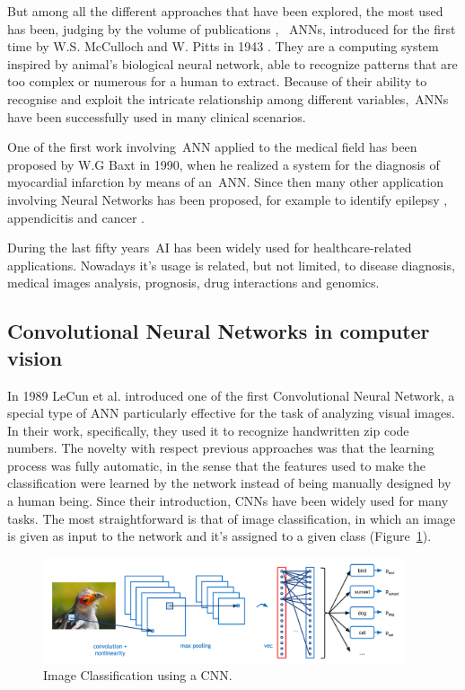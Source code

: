 \vspace{5mm}
But among all the different approaches that have been explored, the most used has been, judging by the volume of publications \cite{steimann2001use}, ~\acp{ANN}, introduced for the first time by W.S. McCulloch and W. Pitts in 1943 \cite{mcculloch1943logical}. They are a computing system inspired by animal's biological neural network, able to recognize patterns that are too complex or numerous for a human to extract. Because of their ability to recognise and exploit the intricate relationship among different variables,~\acp{ANN} have been successfully used in many clinical scenarios. 

\noindent One of the first work involving~\ac{ANN} applied to the medical field has been proposed by W.G Baxt in 1990, when he realized a system for the diagnosis of myocardial infarction by means of an~\ac{ANN}. Since then many other application involving Neural Networks has been proposed, for example to identify epilepsy \cite{epilepsy}, appendicitis \cite{appendicitis} and cancer \cite{cancer}.

\noindent During the last fifty years~\ac{AI} has been widely used for healthcare-related applications. Nowadays it's usage is related, but not limited, to disease diagnosis, medical images analysis, prognosis, drug interactions and genomics.


\subsection{Convolutional Neural Networks in computer vision}
\label{subsec:convolutional_neural_networks}
In 1989 LeCun et al. \cite{lecun} introduced one of the first Convolutional Neural Network, a special type of \ac{ANN} particularly effective for the task of analyzing visual images. In their work, specifically, they used it to recognize handwritten zip code numbers. The novelty with respect previous approaches was that the learning process was fully automatic, in the sense that the features used to make the classification were learned by the network instead of being manually designed by a human being. Since their introduction, \acp{CNN} have been widely used for many tasks. The most straightforward is that of image classification, in which an image is given as input to the network and it's assigned to a given class (Figure~\ref{fig:first_figure}).
\begin{figure}[htbp!]
\centering
\includegraphics[width=0.95\textwidth]{Tesi/images/image_classification}
\caption{Image Classification using a \ac{CNN}.}
\label{fig:first_figure}
\end{figure}

